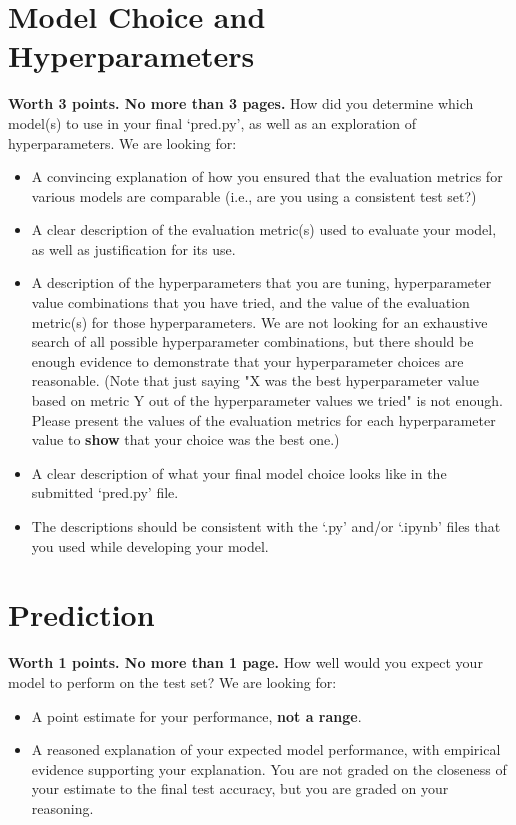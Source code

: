 \documentclass[12pt]{article}
\begin{document}
\section{Model Choice and Hyperparameters}

\textbf{Worth 3 points. No more than 3 pages.} How did you determine which model(s)
to use in your final `pred.py', as well as an exploration of hyperparameters.
We are looking for:
\begin{itemize}
	\item A convincing explanation of how you ensured that the evaluation metrics for various
	models are comparable (i.e., are you using a consistent test set?)
	\item A clear description of the evaluation metric(s) used to evaluate your model, 
	as well as justification for its use.
	\item A description of the hyperparameters that you are tuning, hyperparameter value
	combinations that you have tried, and the value of the evaluation metric(s)
	for those hyperparameters.
	We are not looking for an exhaustive search of all possible hyperparameter 
	combinations, but there should be enough evidence to demonstrate that your
	hyperparameter choices are reasonable.
	(Note that just saying "X was the best hyperparameter value based on metric Y out of
	the hyperparameter values we tried" is not enough. Please present the values of the
	evaluation metrics for each hyperparameter value to \textbf{show} that your choice was the best one.)
	\item A clear description of what your final model choice looks like in the
	submitted `pred.py' file.
	\item The descriptions should be consistent with the `.py' and/or `.ipynb' files that you
	used while developing your model.
\end{itemize}


\section{Prediction}

\textbf{Worth 1 points. No more than 1 page.} How well would you expect your model to perform on the
test set? We are looking for:
\begin{itemize}
	\item A point estimate for your performance, \textbf{not a range}.
	\item A reasoned explanation of your expected model performance, with empirical
	evidence supporting your explanation. 
	You are not graded on the closeness of your estimate to the final test accuracy,
	but you are graded on your reasoning.
\end{itemize}
\end{document}
